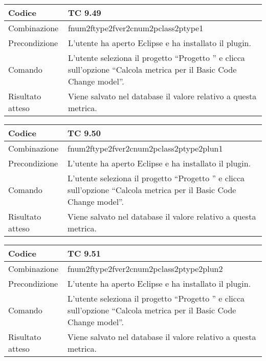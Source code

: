 \begin{table}[ht]
\begin{tabular}{|p{3cm}|p{9cm}|}
\hline
\cellcolor{lightgray}Codice				& TC 9.49								\\
\hline
\cellcolor{lightgray}Combinazione		& fnum2ftype2fver2cnum2pclass2ptype1									\\
\hline
\cellcolor{lightgray}Precondizione		& L'utente ha aperto Eclipse e ha installato il plugin.		\\
\hline
\cellcolor{lightgray}Comando			& L'utente seleziona il progetto ``Progetto ''  e clicca sull'opzione ``Calcola metrica per il Basic Code Change model''.	\\
\hline
\cellcolor{lightgray}Risultato atteso	& Viene salvato nel database il valore relativo a questa metrica.\\
\hline
\end{tabular}
\end{table}

\begin{table}[ht]
\begin{tabular}{|p{3cm}|p{9cm}|}
\hline
\cellcolor{lightgray}Codice				& TC 9.50								\\
\hline
\cellcolor{lightgray}Combinazione		& fnum2ftype2fver2cnum2pclass2ptype2plun1									\\
\hline
\cellcolor{lightgray}Precondizione		& L'utente ha aperto Eclipse e ha installato il plugin.		\\
\hline
\cellcolor{lightgray}Comando			& L'utente seleziona il progetto ``Progetto ''  e clicca sull'opzione ``Calcola metrica per il Basic Code Change model''.	\\
\hline
\cellcolor{lightgray}Risultato atteso	& Viene salvato nel database il valore relativo a questa metrica.\\
\hline
\end{tabular}
\end{table}

\begin{table}[ht]
\begin{tabular}{|p{3cm}|p{9cm}|}
\hline
\cellcolor{lightgray}Codice				& TC 9.51								\\
\hline
\cellcolor{lightgray}Combinazione		& fnum2ftype2fver2cnum2pclass2ptype2plun2									\\
\hline
\cellcolor{lightgray}Precondizione		& L'utente ha aperto Eclipse e ha installato il plugin.		\\
\hline
\cellcolor{lightgray}Comando			& L'utente seleziona il progetto ``Progetto ''  e clicca sull'opzione ``Calcola metrica per il Basic Code Change model''.	\\
\hline
\cellcolor{lightgray}Risultato atteso	& Viene salvato nel database il valore relativo a questa metrica.\\
\hline
\end{tabular}
\end{table}

